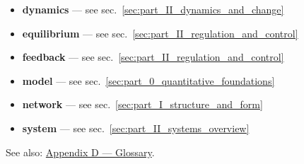 \documentclass[
]{article}
\providecommand{\tightlist}{%
  \setlength{\itemsep}{0pt}\setlength{\parskip}{0pt}}
\theoremstyle{plain}
\theoremstyle{definition}
\begin{document}
\begin{itemize}
\tightlist
\item
  \textbf{dynamics} --- see sec.~\ref{sec:part_II_dynamics_and_change}
\item
  \textbf{equilibrium} --- see
  sec.~\ref{sec:part_II_regulation_and_control}
\item
  \textbf{feedback} --- see
  sec.~\ref{sec:part_II_regulation_and_control}
\item
  \textbf{model} --- see sec.~\ref{sec:part_0_quantitative_foundations}
\item
  \textbf{network} --- see sec.~\ref{sec:part_I_structure_and_form}
\item
  \textbf{system} --- see sec.~\ref{sec:part_II_systems_overview}
\end{itemize}

See also: \href{../glossary.md}{Appendix D --- Glossary}.



\providecommand{\bibsection}{}
\renewcommand{\bibsection}{}


\end{document}
